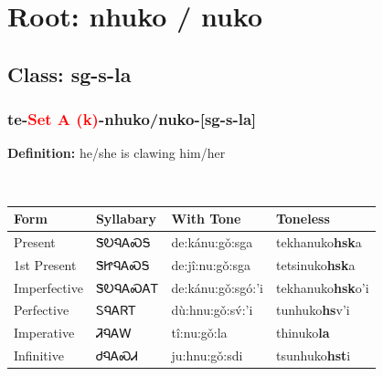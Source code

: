 \needspace{4in}
\section*{Root: nhuko / nuko}
\nopagebreak
{}
\needspace{3in}
\subsection*{Class: sg-s-la}
\nopagebreak
\needspace{2in}
\subsubsection*{te{-}\textcolor{Red}{Set A (k)}{-}\textbf{nhuko/nuko}{-}[sg-s-la]}
\nopagebreak
\textbf{Definition: } he/she is clawing him/her
\\[0.5em]
\begin{tabularx}{\textwidth}{l X X X}%
\toprule%
\textbf{Form}&\textbf{Syllabary}&\textbf{With Tone}&\textbf{Toneless}\\%
\midrule%
Present&ᏕᎧᏄᎪᏍᎦ&de:kánu:gǒ:sga&tekhanuko\textbf{hsk}a\\%
1st Present&ᏕᏥᏄᎪᏍᎦ&de:jî:nu:gǒ:sga&tetsinuko\textbf{hsk}a\\%
Imperfective&ᏕᎧᏄᎪᏍᎪᎢ&de:kánu:gǒ:sgó:’i&tekhanuko\textbf{hsk}o'i\\%
Perfective&ᏚᏄᎪᏒᎢ&dù:hnu:gǒ:sv́:’i&tunhuko\textbf{hs}v'i\\%
Imperative&ᏘᏄᎪᎳ&tî:nu:gǒ:la&thinuko\textbf{la}\\%
Infinitive&ᏧᏄᎪᏍᏗ&ju:hnu:gǒ:sdi&tsunhuko\textbf{hst}i\\%
\bottomrule%
\end{tabularx}
\\[1em]